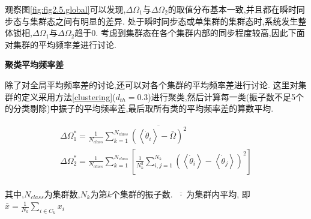 \documentclass{article}
\begin{document}
观察图\ref{fig:fig2.5.global}可以发现,$\Delta \Omega _1$与$\Delta \Omega _2$的取值分布基本一致,并且都在瞬时同步态与集群态之间有明显的差异. 处于瞬时同步态或单集群的集群态时,系统发生整体锁相,$\Delta\Omega_1$与$\Delta\Omega_2$趋于0. 考虑到集群态在各个集群内部的同步程度较高,因此下面对集群的平均频率差进行讨论.

\noindent\textbf{聚类平均频率差}

除了对全局平均频率差的讨论,还可以对各个集群的平均频率差进行讨论. 这里对集群的定义采用方法\ref{clustering}($d_{th}=0.3$)进行聚类,然后计算每一类(振子数不足5个的分类剔除)中振子的平均频率差,最后取所有类的平均频率差的算数平均.

$$
\begin{array}{l}
	\Delta \Omega _{1}^{*}=\frac{1}{N_{class}}\sum_{k=1}^{N_{class}}{\overline{\left( \left< \dot{\theta}_i \right> -\bar{\Omega} \right) ^2}}\\
	\Delta \Omega _{2}^{*}=\frac{1}{N_{class}}\sum_{k=1}^{N_{class}}{\left[ \frac{1}{N_{k}^{2}}\sum_{i,j=1}^{N_k}{\left( \left< \dot{\theta}_i \right> -\left< \dot{\theta}_j \right> \right) ^2} \right]}\\
\end{array}
$$

其中,$N_{class}$为集群数,$N_k$为第$k$个集群的振子数. $\overline{\,\,\cdot \,\,}$为集群内平均, 即$\bar{x}=\frac{1}{N_k}\sum_{i\in C_k}{x_i}$
\end{document}
